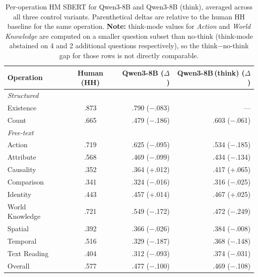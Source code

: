 \begin{table}[h]
\small\centering
\setlength{\tabcolsep}{4pt}

\begin{tabular}{lcrr}
\toprule
\textbf{Operation} & \textbf{Human (HH)} & \textbf{Qwen3-8B ($\Delta$)} & \textbf{Qwen3-8B\,(think) ($\Delta$)} \\
\midrule
\multicolumn{4}{l}{\textit{Structured}} \\
\quad Existence & .873 & .790 \small(\textcolor[HTML]{CC7A00}{$-$.083}) & --- \\
\quad Count & .665 & .479 \small(\textcolor[HTML]{CC7A00}{$-$.186}) & .603 \small(\textcolor[HTML]{CC7A00}{$-$.061}) \\
\midrule
\multicolumn{4}{l}{\textit{Free-text}} \\
\quad Action & .719 & .625 \small(\textcolor[HTML]{CC7A00}{$-$.095}) & .534 \small(\textcolor[HTML]{CC7A00}{$-$.185}) \\
\quad Attribute & .568 & .469 \small(\textcolor[HTML]{CC7A00}{$-$.099}) & .434 \small(\textcolor[HTML]{CC7A00}{$-$.134}) \\
\quad Causality & .352 & .364 \small(\textcolor[HTML]{0072B2}{+.012}) & .417 \small(\textcolor[HTML]{0072B2}{+.065}) \\
\quad Comparison & .341 & .324 \small(\textcolor[HTML]{CC7A00}{$-$.016}) & .316 \small(\textcolor[HTML]{CC7A00}{$-$.025}) \\
\quad Identity & .443 & .457 \small(\textcolor[HTML]{0072B2}{+.014}) & .467 \small(\textcolor[HTML]{0072B2}{+.025}) \\
\quad World Knowledge & .721 & .549 \small(\textcolor[HTML]{CC7A00}{$-$.172}) & .472 \small(\textcolor[HTML]{CC7A00}{$-$.249}) \\
\quad Spatial & .392 & .366 \small(\textcolor[HTML]{CC7A00}{$-$.026}) & .384 \small(\textcolor[HTML]{CC7A00}{$-$.008}) \\
\quad Temporal & .516 & .329 \small(\textcolor[HTML]{CC7A00}{$-$.187}) & .368 \small(\textcolor[HTML]{CC7A00}{$-$.148}) \\
\quad Text Reading & .404 & .312 \small(\textcolor[HTML]{CC7A00}{$-$.093}) & .374 \small(\textcolor[HTML]{CC7A00}{$-$.031}) \\
\midrule
Overall & .577 & .477 \small(\textcolor[HTML]{CC7A00}{$-$.100}) & .469 \small(\textcolor[HTML]{CC7A00}{$-$.108}) \\
\bottomrule
\end{tabular}
\caption{Per-operation HM SBERT for Qwen3-8B and Qwen3-8B (think), averaged across all three control variants. Parenthetical deltas are relative to the human HH baseline for the same operation. \textbf{Note:} think-mode values for \textit{Action} and \textit{World Knowledge} are computed on a smaller question subset than no-think (think-mode abstained on 4 and 2 additional questions respectively), so the think$-$no-think gap for those rows is not directly comparable.}
\label{tab:qwen3_op_breakdown}
\end{table}
